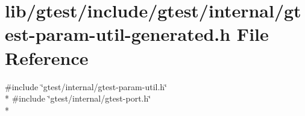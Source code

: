 \hypertarget{gtest-param-util-generated_8h}{\section{lib/gtest/include/gtest/internal/gtest-\/param-\/util-\/generated.h File Reference}
\label{gtest-param-util-generated_8h}
}
{\ttfamily \#include \char`\"{}gtest/internal/gtest-\/param-\/util.\-h\char`\"{}}\\*
{\ttfamily \#include \char`\"{}gtest/internal/gtest-\/port.\-h\char`\"{}}\\*
